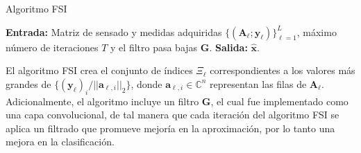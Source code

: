 \begin{algorithm}[!h]
    \caption{Algoritmo FSI}\label{fsi_algo}
    \textbf{Entrada:} Matriz de sensado y medidas adquiridas $\{(\mathbf{A}_\ell;\mathbf{y}_\ell)\}_{\ell=1}^L$, máximo número de iteraciones $T$ y el filtro pasa bajas $ \mathbf{G}$.\newline
    \textbf{Salida:} $\hat{\mathbf{x}}$.
    \begin{algorithmic}[1]
        
        \EndFor
    \end{algorithmic}
    \label{alg_1}
\end{algorithm}

El algoritmo FSI crea el conjunto de índices $\Xi_\ell$ correspondientes a los valores más grandes de $\{(\mathbf{y}_\ell)_{i}/\vert \vert\mathbf{a}_{\ell,i}\vert \vert_2\}$, donde $\mathbf{a}_{\ell,i}\in\mathbb{C}^{n}$ representan las filas de $\mathbf{A}_\ell$. Adicionalmente, el algoritmo incluye un filtro $\mathbf{G}$, el cual fue implementado como una capa convolucional, de tal manera que cada iteración del algoritmo FSI se aplica un filtrado que promueve mejoría en la aproximación, por lo tanto una mejora en la clasificación. 
